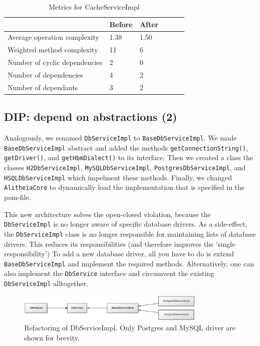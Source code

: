 \documentclass{article}
\begin{document}
\begin{table}
	\centering
    \begin{tabular}{l|llll}
    ~                                 & Before & After & ~ & ~ \\ \hline
    Average operation complexity      & 1.38 & 1.50 \\
    Weighted method complexity        & 11   & 6 \\
    Number of cyclic dependencies     & 2    & 0 \\
    Number of dependencies            & 4    & 2 \\
    Number of dependants              & 3    & 2 \\
    \end{tabular}
    \caption{Metrics for CacheServiceImpl}
\end{table}

\subsection{DIP: depend on abstractions (2)}
Analogously, we renamed \verb|DbServiceImpl| to \verb|BaseDbServiceImpl|. We made \verb|BaseDbServiceImpl| abstract and added the methods \verb|getConnectionString()|, \verb|getDriver()|, and \verb|getHbmDialect()| to its interface. Then we created a class the classes \verb|H2DbServiceImpl|, \verb|MySQLDbServiceImpl|, \verb|PostgresDbServiceImpl|, and \verb|HSQLDbServiceImpl| which impelment these methods. Finally, we changed \verb|AlitheiaCore| to dynamically load the implementation that is specified in the pom-file.

This new architecture solves the open-closed violation, because the \verb|DbServiceImpl| is no longer aware of specific database drivers. As a side-effect, the \verb|DbServiceImpl| class is no longer responsible for maintaining lists of database drivers. This reduces its responsibilities (and therefore improves the `single responsibility') To add a new database driver, all you have to do is extend \verb|BaseDbServiceImpl| and implement the required methods. Alternatively, one can also implement the \verb|DbService| interface and circumvent the existing \verb|DbServiceImpl| alltogether.

\begin{figure}[h]
    \centering
    \includegraphics[width=0.8\textwidth]{dbs}
    \caption{Refactoring of DbServiceImpl. Only Postgres and MySQL driver are shown for brevity.}
    \label{fig:dbs}
\end{figure}
\end{document}
